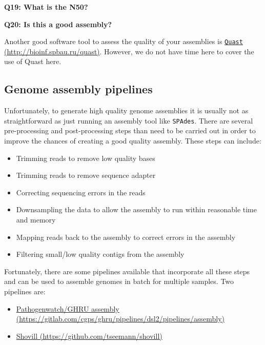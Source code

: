 \documentclass[11pt]{article}
\providecommand{\tightlist}{%
      \setlength{\itemsep}{0pt}\setlength{\parskip}{0pt}}
\begin{document}
\textbf{Q19: What is the N50?}

\textbf{Q20: Is this a good assembly?}

    Another good software tool to assess the quality of your assemblies is
\href{http://bioinf.spbau.ru/quast}{\texttt{Quast}
(http://bioinf.spbau.ru/quast)}. However, we do not have time here to
cover the use of Quast here.

    \hypertarget{genome-assembly-pipelines}{%
\subsection{Genome assembly pipelines}\label{genome-assembly-pipelines}}

Unfortunately, to generate high quality genome assemblies it is usually
not as straightforward as just running an assembly tool like
\texttt{SPAdes}. There are several pre-processing and post-processing
steps than need to be carried out in order to improve the chances of
creating a good quality assembly. These steps can include:

\begin{itemize}
\tightlist
\item
  Trimming reads to remove low quality bases
\item
  Trimming reads to remove sequence adapter
\item
  Correcting sequencing errors in the reads
\item
  Downsampling the data to allow the assembly to run within reasonable
  time and memory
\item
  Mapping reads back to the assembly to correct errors in the assembly
\item
  Filtering small/low quality contigs from the assembly
\end{itemize}

    Fortunately, there are some pipelines available that incorporate all
these steps and can be used to assemble genomes in batch for multiple
samples. Two pipelines are:

\begin{itemize}
\tightlist
\item
  \href{https://gitlab.com/cgps/ghru/pipelines/dsl2/pipelines/assembly}{Pathogenwatch/GHRU
  assembly
  (https://gitlab.com/cgps/ghru/pipelines/dsl2/pipelines/assembly)}
\item
  \href{https://github.com/tseemann/shovill}{Shovill
  (https://github.com/tseemann/shovill)}
\end{itemize}
\end{document}
